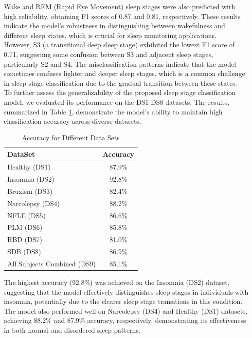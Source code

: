 Wake and REM (Rapid Eye Movement) sleep stages were also predicted with high reliability, obtaining F1 scores of 0.87 and 0.81, respectively. These results indicate the model’s robustness in distinguishing between wakefulness and different sleep states, which is crucial for sleep monitoring applications. \\

However, S3 (a transitional deep sleep stage) exhibited the lowest F1 score of 0.71, suggesting some confusion between S3 and adjacent sleep stages, particularly S2 and S4. The misclassification patterns indicate that the model sometimes confuses lighter and deeper sleep stages, which is a common challenge in sleep stage classification due to the gradual transition between these states. \\

To further assess the generalizability of the proposed sleep stage classification model, we evaluated its performance on the DS1-DS8 datasets. The results, summarized in Table \ref{tab:accuracy}, demonstrate the model's ability to maintain high classification accuracy across diverse datasets.

\begin{table}[H]
    \centering
    \begin{tabular}{|l|c|}
        \hline
        \textbf{DataSet} & \textbf{Accuracy} \\
        \hline
        Healthy (DS1) & 87.9\% \\
        Insomnia (DS2) & 92.8\% \\
        Bruxism (DS3) & 82.4\% \\
        Narcolepsy (DS4) & 88.2\% \\
        NFLE (DS5) & 86.6\% \\
        PLM (DS6) & 85.8\% \\
        RBD (DS7) & 81.0\% \\
        SDB (DS8) & 86.9\% \\
        All Subjects Combined (DS9) & 85.1\% \\
        \hline
    \end{tabular}
    \caption{Accuracy for Different Data Sets}
    \label{tab:accuracy}
\end{table}

The highest accuracy (92.8\%) was achieved on the Insomnia (DS2) dataset, suggesting that the model effectively distinguishes sleep stages in individuals with insomnia, potentially due to the clearer sleep stage transitions in this condition. The model also performed well on Narcolepsy (DS4) and Healthy (DS1) datasets, achieving 88.2\% and 87.9\% accuracy, respectively, demonstrating its effectiveness in both normal and disordered sleep patterns. \\

